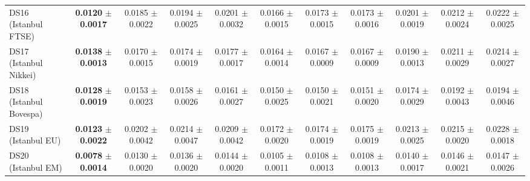 \begin{table}[t]
{{\begin{tabular}{lcccccccccc}
DS16 (Istanbul FTSE) & \textbf{0.0120} $\pm$ \textbf{0.0017} & 0.0185 $\pm$ 0.0022 & 0.0194 $\pm$ 0.0025 & 0.0201 $\pm$ 0.0032 & 0.0166 $\pm$ 0.0015 & 0.0173 $\pm$ 0.0015 & 0.0173 $\pm$ 0.0016 & 0.0201 $\pm$ 0.0019 & 0.0212 $\pm$ 0.0024 & 0.0222 $\pm$ 0.0025 \\
DS17 (Istanbul Nikkei) & \textbf{0.0138} $\pm$ \textbf{0.0013} & 0.0170 $\pm$ 0.0015 & 0.0174 $\pm$ 0.0019 & 0.0177 $\pm$ 0.0017 & 0.0164 $\pm$ 0.0014 & 0.0167 $\pm$ 0.0009 & 0.0167 $\pm$ 0.0009 & 0.0190 $\pm$ 0.0013 & 0.0211 $\pm$ 0.0029 & 0.0214 $\pm$ 0.0027 \\
DS18 (Istanbul Bovespa) & \textbf{0.0128} $\pm$ \textbf{0.0019} & 0.0153 $\pm$ 0.0023 & 0.0158 $\pm$ 0.0026 & 0.0161 $\pm$ 0.0027 & 0.0150 $\pm$ 0.0025 & 0.0150 $\pm$ 0.0021 & 0.0151 $\pm$ 0.0020 & 0.0174 $\pm$ 0.0029 & 0.0192 $\pm$ 0.0043 & 0.0194 $\pm$ 0.0046 \\
DS19 (Istanbul EU) & \textbf{0.0123} $\pm$ \textbf{0.0022} & 0.0202 $\pm$ 0.0042 & 0.0214 $\pm$ 0.0047 & 0.0209 $\pm$ 0.0042 & 0.0172 $\pm$ 0.0020 & 0.0174 $\pm$ 0.0019 & 0.0175 $\pm$ 0.0019 & 0.0213 $\pm$ 0.0025 & 0.0215 $\pm$ 0.0020 & 0.0228 $\pm$ 0.0018 \\
DS20 (Istanbul EM) & \textbf{0.0078} $\pm$ \textbf{0.0014} & 0.0130 $\pm$ 0.0020 & 0.0136 $\pm$ 0.0020 & 0.0144 $\pm$ 0.0020 & 0.0105 $\pm$ 0.0011 & 0.0108 $\pm$ 0.0013 & 0.0108 $\pm$ 0.0013 & 0.0140 $\pm$ 0.0017 & 0.0146 $\pm$ 0.0021 & 0.0147 $\pm$ 0.0026 \\
\bottomrule
\end{tabular}%
}%
}
\end{table}
